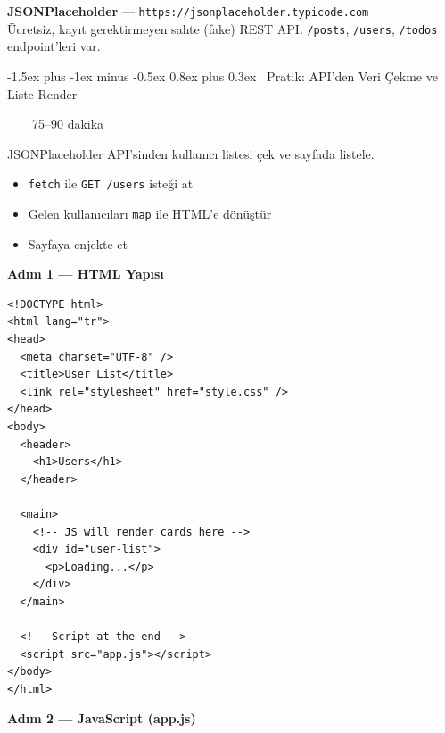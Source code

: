 \documentclass[12pt, a4paper]{article}
\makeatletter
\renewcommand{\section}{%
  \@startsection{section}{1}{\z@}%
    {-1.5ex plus -1ex minus -0.5ex}%
    {0.8ex plus 0.3ex}%
    {\normalfont\Large\bfseries\sffamily\color{primary}}%
}
\newcommand{\timebadge}[1]{%
  \noindent
  \colorbox{primary}{\color{white}\sffamily\bfseries\small\strut~~\faStopwatch~~#1~~}%
  \par\vspace{4pt}%
}
\makeatother
\begin{document}
\begin{infobox}
\textbf{JSONPlaceholder} --- \texttt{https://jsonplaceholder.typicode.com}\\
Ücretsiz, kayıt gerektirmeyen sahte (fake) REST API.
\texttt{/posts}, \texttt{/users}, \texttt{/todos} endpoint'leri var.
\end{infobox}

\newpage
\section{\faHammer\ Pratik: API'den Veri Çekme ve Liste Render}
\timebadge{75--90 dakika}

\begin{practicebox}
JSONPlaceholder API'sinden kullanıcı listesi çek ve sayfada listele.
\begin{itemize}
  \item \texttt{fetch} ile \texttt{GET /users} isteği at
  \item Gelen kullanıcıları \texttt{map} ile HTML'e dönüştür
  \item Sayfaya enjekte et
\end{itemize}
\end{practicebox}

\vspace{8pt}
\textbf{Adım 1 --- HTML Yapısı}

\begin{tcolorbox}[enhanced, colback=codebg, colframe=gray!30,
    colbacktitle=primary!85!black, coltitle=white, arc=4pt,
    title={\sffamily\bfseries\small index.html}]
\begin{lstlisting}[style=jsstyle]
<!DOCTYPE html>
<html lang="tr">
<head>
  <meta charset="UTF-8" />
  <title>User List</title>
  <link rel="stylesheet" href="style.css" />
</head>
<body>
  <header>
    <h1>Users</h1>
  </header>

  <main>
    <!-- JS will render cards here -->
    <div id="user-list">
      <p>Loading...</p>
    </div>
  </main>

  <!-- Script at the end -->
  <script src="app.js"></script>
</body>
</html>
\end{lstlisting}
\end{tcolorbox}

\vspace{8pt}
\textbf{Adım 2 --- JavaScript (app.js)}
\end{document}
